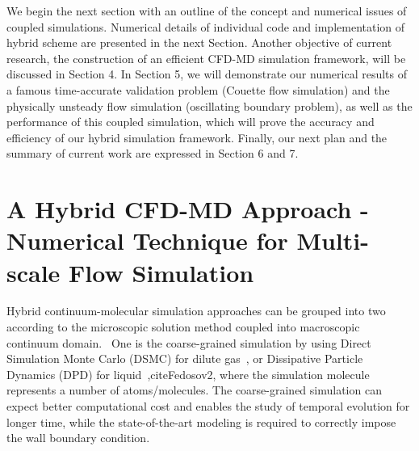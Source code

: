 \documentclass[conference,final]{IEEEtran}
\begin{document}
We begin the next section with an outline of the concept and numerical issues of coupled simulations. Numerical details of individual code and implementation of hybrid scheme are presented in the next Section. Another objective of current research, the construction of an efficient CFD-MD simulation framework, will be discussed in Section 4. In Section 5, we will demonstrate our numerical results of a famous time-accurate validation problem (Couette flow simulation) and the physically unsteady flow simulation (oscillating boundary problem), as well as the performance of this coupled simulation, which will prove the accuracy and efficiency of our hybrid simulation framework. Finally, our next plan and the summary of current work are expressed in Section 6 and 7.


\section{A Hybrid CFD-MD Approach - Numerical Technique for Multi-scale Flow Simulation}

Hybrid continuum-molecular simulation approaches can be grouped into two according to the microscopic solution method coupled into macroscopic continuum domain.~\cite{Koumoutsakos} One is the coarse-grained simulation by using Direct Simulation Monte Carlo (DSMC) for dilute gas~\cite{Garcia},\cite{Sun} or Dissipative Particle Dynamics (DPD) for liquid~\cite{Fedosov1},cite{Fedosov2}, where the simulation molecule represents a number of atoms/molecules. The coarse-grained simulation can expect better computational cost and enables the study of temporal evolution for longer time, while the state-of-the-art modeling is required to correctly impose the wall boundary condition.
\end{document}
